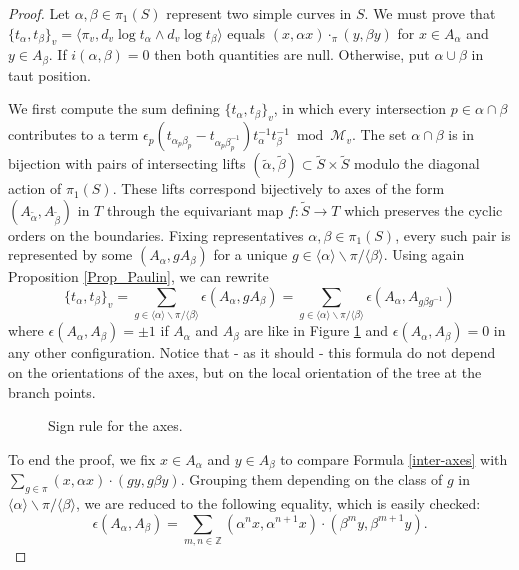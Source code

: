 \documentclass{amsart}
\newcommand{\Z}{\mathbb{Z}}
\newcommand{\Mm}{\mathcal{M}}
\begin{document}
\begin{proof}
Let $\alpha,\beta \in \pi_1(S)$ represent two simple curves in $S$. We must prove that $\{t_\alpha,t_\beta\}_v=\langle \pi_v,d_v\log t_\alpha\wedge d_v\log t_\beta\rangle$ equals $(x,\alpha x)\cdot_\pi(y,\beta y)$ for $x\in A_\alpha$ and $y\in A_\beta$.
%
If $i(\alpha,\beta)=0$ then both quantities are null.
%
Otherwise, put $\alpha \cup \beta$ in taut position.

We first compute the sum defining $\{t_\alpha,t_\beta\}_v$, in which every intersection $p \in \alpha\cap \beta$ contributes to a term $\epsilon_p(t_{\alpha_p\beta_p}-t_{\alpha_p\beta_p^{-1}}) t_\alpha^{-1}t_\beta^{-1}\bmod{\Mm_v}$. 
%
The set $\alpha\cap \beta$ is in bijection with pairs of intersecting lifts $(\tilde{\alpha},\tilde{\beta})\subset \tilde{S}\times \tilde{S}$ modulo the diagonal action of $\pi_1(S)$.
%
%
These lifts correspond bijectively to axes of the form $(A_{\tilde{\alpha}}, A_{\tilde{\beta}})$ in $T$ through the equivariant map $f:\tilde{S}\to T$ which preserves the cyclic orders on the boundaries. %
%
Fixing representatives $\alpha,\beta \in \pi_1(S)$, every such pair is represented by some $(A_\alpha,gA_\beta)$ for a unique $g\in \langle \alpha\rangle\backslash\pi/\langle\beta\rangle$. 
%
Using again Proposition \ref{Prop_Paulin}, we can rewrite 
\begin{equation}\label{inter-axes}
\{t_\alpha,t_\beta\}_v=\sum_{g\in \langle \alpha\rangle\backslash\pi/\langle \beta\rangle}\epsilon(A_{\alpha},gA_{\beta})
=\sum_{g\in \langle \alpha\rangle\backslash\pi/\langle \beta\rangle}\epsilon(A_{\alpha},A_{g\beta g^{-1}})
\end{equation}
where $\epsilon(A_\alpha,A_\beta)=\pm 1$ if $A_\alpha$ and $A_\beta$ are like in Figure \ref{or-axes} and $\epsilon(A_\alpha,A_\beta)=0$ in any other configuration. Notice that - as it should - this formula do not depend on the orientations of the axes, but on the local orientation of the tree at the branch points.

\begin{figure}[htbp]
    \centering
    \def\svgwidth{6cm}
    
    \caption{Sign rule for the axes.}
    \label{or-axes}
\end{figure}

To end the proof, we fix $x\in A_{\alpha}$ and $y\in A_{\beta}$ to compare Formula \eqref{inter-axes} with $\sum_{g\in \pi} (x,\alpha x)\cdot(gy,g\beta y)$. Grouping them depending on the class of $g$ in $\langle \alpha\rangle \backslash\pi/\langle \beta\rangle$, we are reduced to the following equality, which is easily checked:
$$\epsilon(A_\alpha,A_\beta)=\sum_{m,n\in \Z} (\alpha^n x,\alpha^{n+1} x)\cdot(\beta^m y,\beta^{m+1} y).$$
\end{proof}
\end{document}
